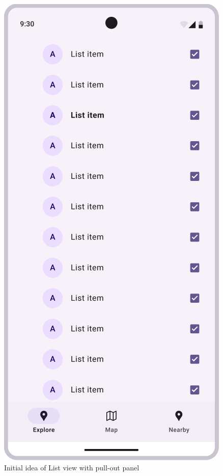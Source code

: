 \begin{figure}[H]
\begin{minipage}{0.3\textwidth}
        \caption{Initial idea of List view with pull-out panel}
    \end{minipage}
    \hspace{0.3cm}
    \begin{minipage}{0.3\textwidth}
        \centering
        \includegraphics[width=\textwidth]{images/paul/wireframes/listScreenv2.png}

\end{minipage}
\end{figure}
